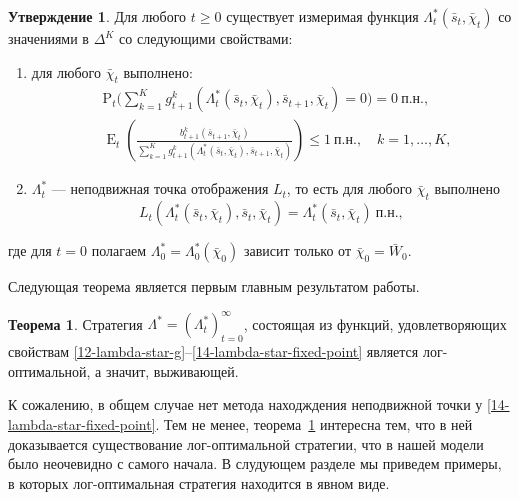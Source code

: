 \documentclass[a4paper,12pt,russian]{article} %
\theoremstyle{definition}
\newtheorem{theorem}{Теорема}
\newtheorem{proposition}{Утверждение}
\DeclareMathOperator{\E}{E}
\renewcommand{\P}{\mathrm{P}}
\begin{document}
\begin{proposition}
\label{lemma2-lambda-star}
Для любого $t\ge0$ существует измеримая функция $\Lambda_t^*(\bar s_t,\bar\chi_t)$ со значениями в  $\Delta^K$ со следующими свойствами:
\begin{enumerate}[leftmargin=*,label=(\alph*),widest=a]
\item для любого $\bar\chi_t$ выполнено:
\begin{align}
\label{12-lambda-star-g}
&\P_t\Biggl(
    \sum_{k=1}^K g_{t+1}^k(\Lambda_t^*(\bar s_t,\bar\chi_t),\bar s_{t+1},\bar\chi_t) = 0
  \Biggr) = 0\ \text{п.н.},\\
\label{13-lambda-star-inequality}
&\E_t\left( 
  \frac{b_{t+1}^k(\bar s_{t+1},\bar\chi_t)}
       {\sum_{k=1}^K g_{t+1}^k(\Lambda^*_t(\bar s_{t},\bar\chi_t), \bar s_{t+1},\bar\chi_t)}
  \right) \le 1\ \text{п.н.}, \quad k=1,\dots,K,
\end{align}

\item $\Lambda_t^*$ — неподвижная точка отображения $L_t$, то есть для любого $\bar\chi_t$ выполнено
\begin{equation}
\label{14-lambda-star-fixed-point}
L_{t}(\Lambda_{t}^*(\bar s_t,\bar\chi_t), \bar s_t, \bar\chi_t) 
= \Lambda^*_{t}(\bar s_t,\bar\chi_t)\ \text{п.н.}, 
\end{equation}
\end{enumerate}
где для $t=0$ полагаем $\Lambda_0^*=\Lambda^*_0(\bar\chi_0)$ зависит только от $\bar\chi_0=\bar W_0$.
\end{proposition}



Следующая теорема является первым главным результатом работы.


\begin{theorem}
\label{theorem1-main}
Стратегия $\Lambda^* = (\Lambda_t^*)_{t=0}^\infty$, состоящая из функций, удовлетворяющих свойствам \eqref{12-lambda-star-g}--\eqref{14-lambda-star-fixed-point} является лог-оптимальной, а значит, выживающей.
\end{theorem}

К сожалению, в общем случае нет метода находждения неподвижной точки у \eqref{14-lambda-star-fixed-point}. Тем не менее, теорема~\ref{theorem1-main} интересна тем, что в ней доказывается существование лог-оптимальной стратегии, что в нашей модели было неочевидно с самого начала. В слудующем разделе мы приведем примеры, в которых лог-оптимальная стратегия находится в явном виде.
\end{document}
